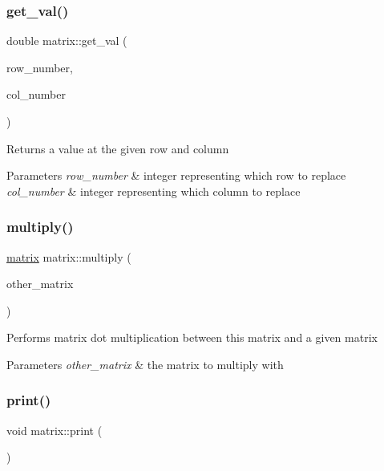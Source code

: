 \subsubsection{\texorpdfstring{get\+\_\+val()}{get\_val()}}
{\footnotesize\ttfamily double matrix\+::get\+\_\+val (\begin{DoxyParamCaption}\item[{int}]{row\+\_\+number,  }\item[{int}]{col\+\_\+number }\end{DoxyParamCaption})}

Returns a value at the given row and column 
\begin{DoxyParams}{Parameters}
{\em row\+\_\+number} & integer representing which row to replace \\
\hline
{\em col\+\_\+number} & integer representing which column to replace \\
\hline
\end{DoxyParams}
\mbox{\label{classmatrix_a34563095940d2be0e50d98fbb2ba9ead}} 
\subsubsection{\texorpdfstring{multiply()}{multiply()}}
{\footnotesize\ttfamily \mbox{\hyperlink{classmatrix}{matrix}} matrix\+::multiply (\begin{DoxyParamCaption}\item[{\mbox{\hyperlink{classmatrix}{matrix}}}]{other\+\_\+matrix }\end{DoxyParamCaption})}

Performs matrix dot multiplication between this matrix and a given matrix 
\begin{DoxyParams}{Parameters}
{\em other\+\_\+matrix} & the matrix to multiply with \\
\hline
\end{DoxyParams}
\mbox{\label{classmatrix_a820379d929b5a1c49c9df0d05f91c7e2}} 
\subsubsection{\texorpdfstring{print()}{print()}}
{\footnotesize\ttfamily void matrix\+::print (\begin{DoxyParamCaption}{ }\end{DoxyParamCaption})}

